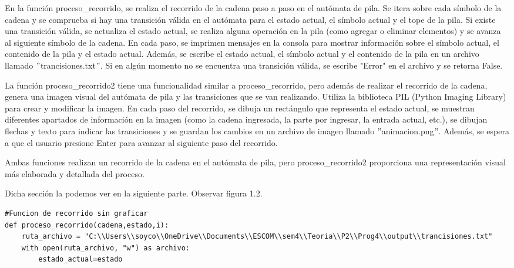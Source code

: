 \begin{enumerate}
En la función proceso\_recorrido, se realiza el recorrido de la cadena paso a paso en el autómata de pila. Se itera sobre cada símbolo de la cadena y se comprueba si hay una transición válida en el autómata para el estado actual, el símbolo actual y el tope de la pila. Si existe una transición válida, se actualiza el estado actual, se realiza alguna operación en la pila (como agregar o eliminar elementos) y se avanza al siguiente símbolo de la cadena. En cada paso, se imprimen mensajes en la consola para mostrar información sobre el símbolo actual, el contenido de la pila y el estado actual. Además, se escribe el estado actual, el símbolo actual y el contenido de la pila en un archivo llamado $"$trancisiones.txt$"$. Si en algún momento no se encuentra una transición válida, se escribe "Error" en el archivo y se retorna False.\newline

La función proceso\_recorrido2 tiene una funcionalidad similar a proceso\_recorrido, pero además de realizar el recorrido de la cadena, genera una imagen visual del autómata de pila y las transiciones que se van realizando. Utiliza la biblioteca PIL (Python Imaging Library) para crear y modificar la imagen. En cada paso del recorrido, se dibuja un rectángulo que representa el estado actual, se muestran diferentes apartados de información en la imagen (como la cadena ingresada, la parte por ingresar, la entrada actual, etc.), se dibujan flechas y texto para indicar las transiciones y se guardan los cambios en un archivo de imagen llamado $"$animacion.png$"$. Además, se espera a que el usuario presione Enter para avanzar al siguiente paso del recorrido.\newline

Ambas funciones realizan un recorrido de la cadena en el autómata de pila, pero proceso\_recorrido2 proporciona una representación visual más elaborada y detallada del proceso.\newline


Dicha sección la podemos ver en la siguiente parte. Observar figura 1.2. \newline
\begin{lstlisting}
#Funcion de recorrido sin graficar
def proceso_recorrido(cadena,estado,i):
    ruta_archivo = "C:\\Users\\soyco\\OneDrive\\Documents\\ESCOM\\sem4\\Teoria\\P2\\Prog4\\output\\trancisiones.txt"
    with open(ruta_archivo, "w") as archivo:
        estado_actual=estado
        

\end{lstlisting}
\end{enumerate}
